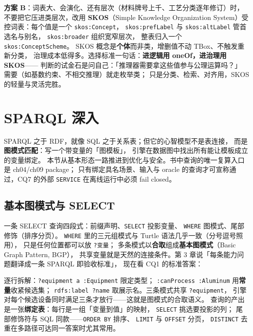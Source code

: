 \textbf{方案 B}：词表大、会演化、还有层次（材料牌号上千、工艺分类逐年修订）时，
不要把它压进类层次，改用 \textbf{SKOS}（Simple Knowledge
Organization System）受控词表：每个值是一个 \texttt{skos:Concept}，
\texttt{skos:prefLabel} 与 \texttt{skos:altLabel} 管首选名与别名，
\texttt{skos:broader} 组织宽窄层次，
整表归入一个 \texttt{skos:ConceptScheme}。
SKOS 概念是\textbf{个体}而非类，增删值不动 TBox、不触发重新分类，
治理成本低得多。选择标准一句话：\textbf{进逻辑用 oneOf，进治理用 SKOS}——
判断的试金石是问自己：「推理器需要拿这些值参与公理运算吗？」
需要（如基数约束、不相交推理）就走枚举类；
只是分类、检索、对齐用，SKOS 的轻量与灵活完胜。

\section{SPARQL 深入}

SPARQL 之于 RDF，就像 SQL 之于关系表；但它的心智模型不是表连接，
而是\textbf{图模式匹配}：写一个带变量的「图模板」，
引擎在数据图中找出所有能让模板成立的变量绑定。
本节从基本形态一路推进到优化与安全。书中查询的唯一复算入口是 ch04/ch09 package；
只有绑定具名场景、输入与 oracle 的查询才可宣称通过，CQ7 的外部
\texttt{SERVICE} 在离线运行中必须 fail closed。

\subsection{基本图模式与 SELECT}

一条 SELECT 查询四段式：前缀声明、\texttt{SELECT} 投影变量、
\texttt{WHERE} 图模式、尾部修饰（排序分页）。
\texttt{WHERE} 里的三元组模式与 Turtle 语法几乎一致（分号逗号照用），
只是任何位置都可以放 \texttt{?变量}；
多条模式以\textbf{合取}组成\textbf{基本图模式}（Basic Graph Pattern, BGP），
共享变量就是天然的连接条件。第 3 章说「每条能力问题翻译成一条 SPARQL 即验收标准」，
现在看 CQ1 的标准答案：



逐行拆解：\texttt{?equipment a :Equipment} 限定类型；
\texttt{:canProcess :Aluminum} 用\textbf{常量}收紧候选集；
\texttt{rdfs:label ?name} 取展示名。三条模式共享 \texttt{?equipment}，
引擎对每个候选设备同时满足三条才放行——这就是图模式的合取语义。
查询的产出是一张\textbf{绑定表}：每行是一组「变量到值」的映射，
\texttt{SELECT} 挑选要投影的列；
尾部修饰符与 SQL 同款——\texttt{ORDER BY} 排序、
\texttt{LIMIT} 与 \texttt{OFFSET} 分页，
\texttt{DISTINCT} 去重在多路径可达同一答案时尤其常用。

